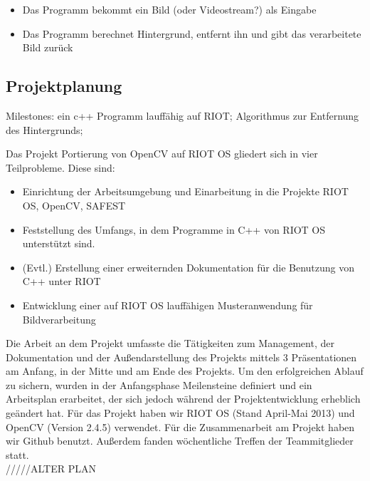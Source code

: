 \documentclass[10pt,a4paper]{article}
\begin{document}
\begin{itemize}
\item Das Programm bekommt ein Bild (oder Videostream?) als Eingabe
\item Das Programm berechnet Hintergrund, entfernt ihn und gibt das verarbeitete Bild zurück
\end{itemize}

\subsection{Projektplanung}

Milestones: ein c++ Programm lauffähig auf RIOT; Algorithmus zur Entfernung des Hintergrunds;


Das Projekt Portierung von OpenCV auf RIOT OS gliedert sich in vier Teilprobleme. Diese sind:
\begin{itemize}
\item Einrichtung der Arbeitsumgebung und Einarbeitung in die Projekte RIOT OS, OpenCV, SAFEST
\item Feststellung des Umfangs, in dem Programme in C++ von RIOT OS unterstützt sind.
\item (Evtl.) Erstellung einer erweiternden Dokumentation für die Benutzung von C++ unter RIOT
\item Entwicklung einer auf RIOT OS lauffähigen Musteranwendung für Bildverarbeitung
\end{itemize}

Die Arbeit an dem Projekt umfasste die Tätigkeiten zum Management, der Dokumentation und der Außendarstellung des Projekts mittels 3 Präsentationen am Anfang, in der Mitte und am Ende des Projekts. Um den erfolgreichen Ablauf zu sichern, wurden in der Anfangsphase Meilensteine definiert und ein Arbeitsplan erarbeitet, der sich jedoch während der Projektentwicklung erheblich geändert hat. Für das Projekt haben wir RIOT OS (Stand April-Mai 2013) und OpenCV (Version 2.4.5) verwendet. Für die Zusammenarbeit am Projekt haben wir Github benutzt. Außerdem fanden wöchentliche Treffen der Teammitglieder statt. \\

/////ALTER PLAN
\end{document}
